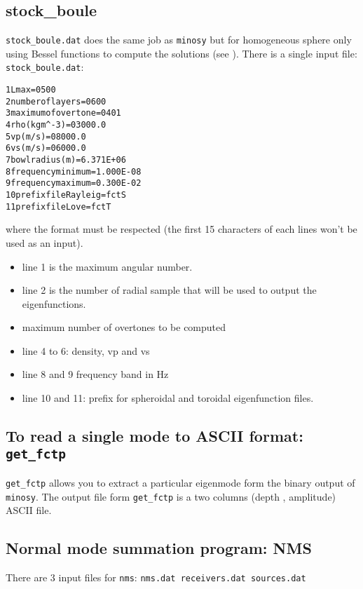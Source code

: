 \documentclass[11pt]{article}
\begin{document}
\subsection{stock\_boule}
{\tt stock\_boule.dat} does the same job as {\tt minosy} but for
homogeneous sphere only using Bessel functions to compute the 
solutions (see ).
There is a single input file:
{\tt stock\_boule.dat}:
\begin{alltt}
 1                Lmax= 0500
 2 number of layers   = 0600
 3 maximum of overtone= 0401
 4      rho (kg m^-3) = 03000.0
 5           vp (m/s) = 08000.0
 6           vs (m/s) = 06000.0
 7  bowl radius(m)    = 6.371E+06
 8  frequency minimum = 1.000E-08
 9  frequency maximum = 0.300E-02
10 prefix file Rayleig= fctS
11 prefix file Love   = fctT
\end{alltt}	
where the format must be respected (the first 15 characters of each
lines won't be used as an input). 
\begin{itemize}	
\item line 1 is the maximum angular number.
\item line 2 is the number of radial sample that will be used
to output the eigenfunctions.
\item maximum number of overtones to be computed
\item line 4 to 6: density, vp and vs
\item line 8 and 9 frequency band in Hz
\item line 10 and 11: prefix for spheroidal and toroidal
eigenfunction files.
\end{itemize}	

\subsection{To read a single mode to ASCII format: {\tt get\_fctp}}
{\tt get\_fctp} allows you to extract a particular eigenmode form the
binary output of {\tt minosy}. The output file form {\tt get\_fctp} is
a two columns  (depth , amplitude) ASCII file.
\subsection{Normal mode summation program: NMS}
There are 3 input files for {\tt nms}: {\tt nms.dat  receivers.dat
sources.dat} 
\end{document}

